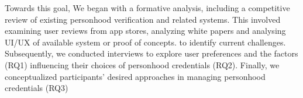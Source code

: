 Towards this goal, 
We began with a formative analysis, including a competitive review of existing personhood verification and related systems. This involved examining user reviews from app stores, analyzing white papers and analysing UI/UX of available system or proof of concepts.
to identify current challenges. 
Subsequently, we conducted interviews to explore user preferences and the factors (RQ1) influencing their choices of personhood credentials (RQ2). Finally, we conceptualized participants' desired approaches in managing personhood credentials (RQ3)\\%

